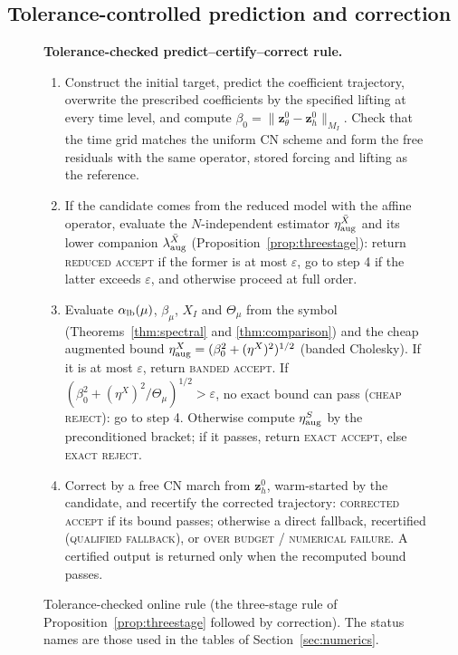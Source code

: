 \documentclass[hidelinks]{siamart251216}
\newcommand{\zz}{\mathbf z}
\newcommand{\Thmu}{\Theta_\mu}
\begin{document}
\subsection{Tolerance-controlled prediction and correction}
\label{ssec:algorithm}\label{ssec:two-stage}\label{ssec:correction}
\begin{figure}[!htbp]
\centering
\begin{minipage}{0.96\linewidth}\small
\textbf{Tolerance-checked predict--certify--correct rule.}
\begin{enumerate}[leftmargin=2em,itemsep=1pt]
\item Construct the initial target, predict the coefficient trajectory, overwrite the prescribed
coefficients by the specified lifting at every time level, and compute
$\beta_0=\|\zz_\theta^0-\zz_h^0\|_{M_I}$.  Check that the time grid matches the uniform CN scheme
and form the free residuals with the same operator, stored forcing and lifting as the reference.
\item If the candidate comes from the reduced model with the affine operator, evaluate the
$N$-independent estimator $\eta^{\bar X}_{\rm aug}$ and its lower companion $\lambda^{\bar X}_{\rm aug}$
(Proposition~\ref{prop:threestage}): return \textsc{reduced accept} if the former is at most
$\varepsilon$, go to step 4 if the latter exceeds $\varepsilon$, and otherwise proceed at full order.
\item Evaluate $\alpha_{\rm lb}(\mu)$, $\beta_\mu$, $X_I$ and $\Thmu$ from the symbol
(Theorems~\ref{thm:spectral} and \ref{thm:comparison}) and the cheap augmented bound
$\eta^X_{\rm aug}=(\beta_0^2+(\eta^X)^2)^{1/2}$ (banded Cholesky).  If it is at most $\varepsilon$,
return \textsc{banded accept}.  If $(\beta_0^2+(\eta^X)^2/\Thmu)^{1/2}>\varepsilon$, no exact bound
can pass (\textsc{cheap reject}): go to step 4.  Otherwise compute $\eta^S_{\rm aug}$ by the
preconditioned bracket; if it passes, return \textsc{exact accept}, else \textsc{exact reject}.
\item Correct by a free CN march from $\zz_h^0$, warm-started by the candidate, and recertify the
corrected trajectory: \textsc{corrected accept} if its bound passes; otherwise a direct fallback,
recertified (\textsc{qualified fallback}), or \textsc{over budget} / \textsc{numerical failure}.  A
certified output is returned only when the recomputed bound passes.
\end{enumerate}
\end{minipage}
\caption{Tolerance-checked online rule (the three-stage rule of Proposition~\ref{prop:threestage}
followed by correction). The status names are those used in the tables of Section~\ref{sec:numerics}.}
\label{alg:pcc}
\end{figure}
\end{document}

